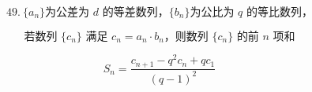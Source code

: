 \[
49.\ \{a_n\}\text{为公差为 }d\text{ 的等差数列，}
\{b_n\}\text{为公比为 }q\text{ 的等比数列，}
\]

\[
\text{若数列 }\{c_n\}\text{ 满足 }
c_n=a_n\cdot b_n，
\text{则数列 }\{c_n\}\text{ 的前 }n\text{ 项和}
\]

\[
S_n=
\frac{c_{n+1}-q^2c_n+qc_1}{(q-1)^2}
\]
